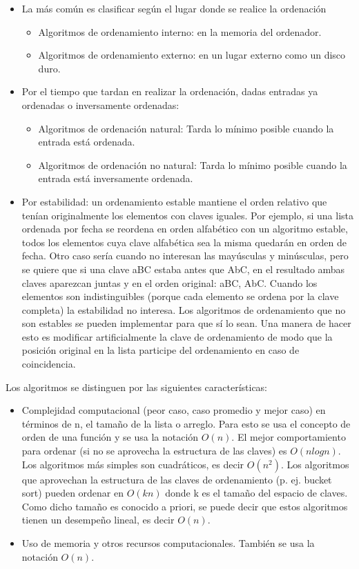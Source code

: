 \documentclass[8pt, A4]{article}    %
\begin{document}
\begin{itemize}
	\item La más común es clasificar según el lugar donde se realice la ordenación
	\begin{itemize}
		\item Algoritmos de ordenamiento interno: en la memoria del ordenador.
		\item Algoritmos de ordenamiento externo: en un lugar externo como un disco duro.
	\end{itemize}
	\item Por el tiempo que tardan en realizar la ordenación, dadas entradas ya ordenadas o inversamente ordenadas:
	\begin{itemize}
		\item Algoritmos de ordenación natural: Tarda lo mínimo posible cuando la entrada está ordenada.
		\item Algoritmos de ordenación no natural: Tarda lo mínimo posible cuando la entrada está inversamente ordenada.
	\end{itemize}
	\item Por estabilidad: un ordenamiento estable mantiene el orden relativo que tenían originalmente los elementos con claves iguales. Por ejemplo, si una lista ordenada por fecha se reordena en orden alfabético con un algoritmo estable, todos los elementos cuya clave alfabética sea la misma quedarán en orden de fecha. Otro caso sería cuando no interesan las mayúsculas y minúsculas, pero se quiere que si una clave aBC estaba antes que AbC, en el resultado ambas claves aparezcan juntas y en el orden original: aBC, AbC. Cuando los elementos son indistinguibles (porque cada elemento se ordena por la clave completa) la estabilidad no interesa. Los algoritmos de ordenamiento que no son estables se pueden implementar para que sí lo sean. Una manera de hacer esto es modificar artificialmente la clave de ordenamiento de modo que la posición original en la lista participe del ordenamiento en caso de coincidencia.
\end{itemize}

Los algoritmos se distinguen por las siguientes características:
\begin{itemize}
	\item Complejidad computacional (peor caso, caso promedio y mejor caso) en términos de n, el tamaño de la lista o arreglo. Para esto se usa el concepto de orden de una función y se usa la notación $O(n)$. El mejor comportamiento para ordenar (si no se aprovecha la estructura de las claves) es $O(nlog n)$. Los algoritmos más simples son cuadráticos, es decir $O(n^2)$. Los algoritmos que aprovechan la estructura de las claves de ordenamiento (p. ej. bucket sort) pueden ordenar en $O(kn)$ donde k es el tamaño del espacio de claves. Como dicho tamaño es conocido a priori, se puede decir que estos algoritmos tienen un desempeño lineal, es decir $O(n)$.
	\item Uso de memoria y otros recursos computacionales. También se usa la notación $O(n)$.
\end{itemize}
\end{document}
